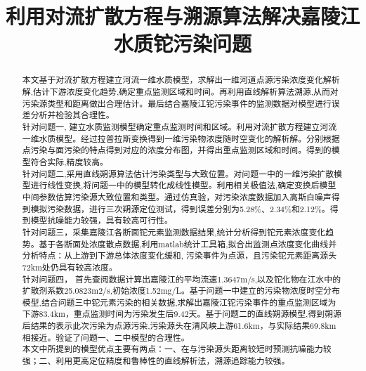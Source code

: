 \documentclass{whutmod}
\title{利用对流扩散方程与溯源算法解决嘉陵江水质铊污染问题}
\begin{document}
	
	
	\begin{abstract}
本文基于对流扩散方程建立河流一维水质模型，求解出一维河道点源污染浓度变化解析解,估计下游浓度变化趋势,确定重点监测区域和时间。再利用直线解析算法溯源,从而对污染源类型和距离做出合理估计。最后结合嘉陵江铊污染事件的监测数据对模型进行误差分析并检验其合理性。
   ~\\
   
针对问题一, 建立水质监测模型确定重点监测时间和区域。利用对流扩散方程建立河流一维水质模型。经过拉普拉斯变换得到一维污染物浓度随时空变化的解析解。分别根据点污染与面污染的特点得到对应的浓度分布图，并得出重点监测区域和时间。得到的模型符合实际,精度较高。   
~\\

针对问题二,采用直线朔源算法估计污染类型与大致位置。对问题一中的一维污染扩散模型进行线性变换,将问题一中的模型转化成线性模型。利用相关极值法,确定变换后模型中间参数估算污染源大致位置和类型。通过仿真验，对污染浓度数据加入高斯白噪声得到模拟污染数据，进行三次朔源定位测试，得到误差分别为5.28\%、2.34\%和2.12\%。得到模型抗噪能力较强，具有较高可行性。
   ~\\

针对问题三，采集嘉陵江各断面铊元素监测数据结果,统计分析得到铊元素浓度变化趋势。基于各断面处浓度散点数据,利用matlab统计工具箱,拟合出监测点浓度变化曲线并分析特点：从上游到下游总体浓度变化缓和, 污染事件为点源，且污染铊元素距离源头72km处仍具有较高浓度。
   ~\\
   
针对问题四，
首先查阅数据计算出嘉陵江的平均流速1.3647m/s,以及铊化物在江水中的扩散剂系数25.0823m2/s,初始浓度1.52mg/L。基于问题一中建立的污染物浓度时空分布模型,结合问题三中铊元素污染的相关数据,求解出嘉陵江铊污染事件的重点监测区域为下游83.4km，重点监测时间为污染发生后9.42天。基于问题二的直线朔源模型,得到朔源后结果的表示此次污染为点源污染,污染源头在清风峡上游61.6km，与实际结果69.8km相接近。验证了问题一、二中模型的合理性。
   ~\\

本文中所提到的模型优点主要有两点：一、在与污染源头距离较短时预测抗噪能力较强；二、利用更高定位精度和鲁棒性的直线解析法，溯源追踪能力较强。
  
		
	\end{abstract}
	
\end{document}
